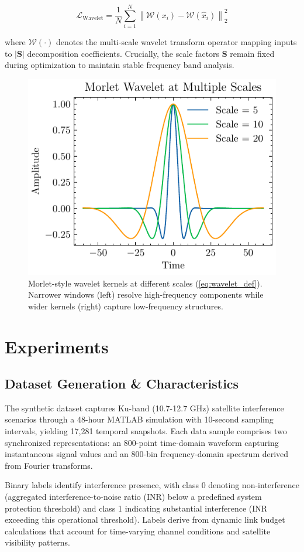\documentclass[12pt]{article}
\begin{document}
\begin{equation}
    \mathcal{L}_{\text{Wavelet}} = \frac{1}{N}\sum_{i=1}^{N} \left\lVert \mathcal{W}(x_i) - \mathcal{W}(\hat{x}_i) \right\rVert_2^2
    \label{eq:wavelet_loss}
\end{equation}

where $\mathcal{W}(\cdot)$ denotes the multi-scale wavelet transform operator mapping inputs to $|\mathbf{S}|$ decomposition coefficients. Crucially, the scale factors $\mathbf{S}$ remain fixed during optimization to maintain stable frequency band analysis.



\begin{figure}[htbp]
    \centering
    \includegraphics[width=0.5\linewidth]{wavelet-scales.pdf}
    \caption{Morlet-style wavelet kernels at different scales (\autoref{eq:wavelet_def}). Narrower windows (left) resolve high-frequency components while wider kernels (right) capture low-frequency structures.}
    \label{fig:wavelet_scales}
\end{figure}

\section{Experiments}

\subsection{Dataset Generation \& Characteristics}
\label{sec:dataset}

The synthetic dataset captures Ku-band (10.7-12.7 GHz) satellite interference scenarios through a 48-hour MATLAB simulation with 10-second sampling intervals, yielding 17,281 temporal snapshots. Each data sample comprises two synchronized representations: an 800-point time-domain waveform capturing instantaneous signal values and an 800-bin frequency-domain spectrum derived from Fourier transforms.

Binary labels identify interference presence, with class 0 denoting non-interference (aggregated interference-to-noise ratio (INR) below a predefined system protection threshold) and class 1 indicating substantial interference (INR exceeding this operational threshold). Labels derive from dynamic link budget calculations that account for time-varying channel conditions and satellite visibility patterns.
\end{document}
